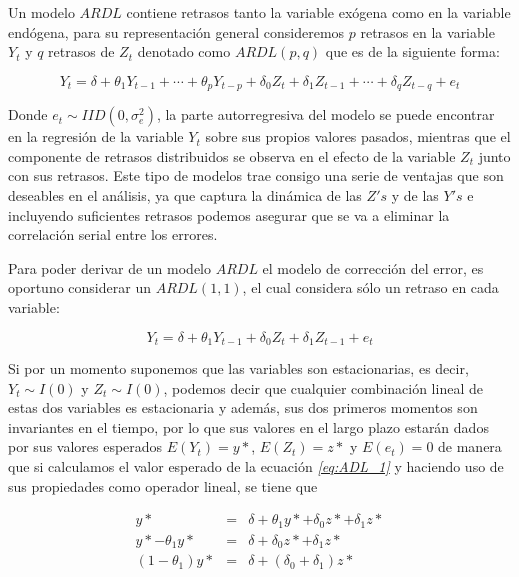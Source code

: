 Un modelo $ARDL$ contiene retrasos tanto la variable exógena como en la variable endógena, para su representación general consideremos $p$ retrasos en la variable $Y_t$ y $q$ retrasos de $Z_t$ denotado como $ARDL(p,q)$ que es de la siguiente forma:

\begin{equation}
Y_t=\delta + \theta_1 Y_{t-1} + \cdots + \theta_p Y_{t-p} + \delta_0 Z_t + \delta_1 Z_{t-1} + \cdots + \delta_q Z_{t-q} + e_t  \label{eq:ADL}
\end{equation}
 
 Donde $e_t\sim IID(0,\sigma^2_e)$, la parte autorregresiva del modelo se puede encontrar en la regresión de la variable $Y_t$ sobre sus propios valores pasados, mientras que el componente de retrasos distribuidos se observa en el efecto de la variable $Z_t$ junto con sus retrasos. Este tipo de modelos trae consigo una serie de ventajas que son deseables en el análisis, ya que captura la dinámica de las $Z's$ y de las $Y's$ e incluyendo suficientes retrasos podemos asegurar que se va a eliminar la correlación serial entre los errores. \bigskip
 
 Para poder derivar de un modelo $ARDL$ el modelo de corrección del error, es oportuno considerar un $ARDL(1,1)$, el cual considera sólo un retraso en cada variable:
 
 \begin{equation}
Y_t=\delta + \theta_1 Y_{t-1} + \delta_0 Z_t + \delta_1 Z_{t-1}  + e_t  \label{eq:ADL_1}
\end{equation}
 
 Si por un momento suponemos que las variables son estacionarias, es decir, $Y_t \sim I(0)$ y $Z_t \sim I(0)$, podemos decir que cualquier combinación lineal de estas dos variables es estacionaria y además, sus dos primeros momentos son invariantes en el tiempo, por lo que sus valores en el largo plazo estarán dados por sus valores esperados $E(Y_t)=y*$, $E(Z_t)=z*$ y $E(e_t)=0$ de manera que si calculamos el valor esperado de la ecuación   \textit{\ref{eq:ADL_1}}  y haciendo uso de sus propiedades como operador lineal, se tiene que
 
 \begin{eqnarray}
y*&=&\delta + \theta_1 y*  + \delta_0 z* + \delta_1 z* \nonumber  \\
 y*- \theta_1 y* &=& \delta + \delta_0 z* + \delta_1 z*  \\
 (1-\theta_1) y* &=& \delta + (\delta_0 + \delta_1)z* \nonumber 
\end{eqnarray}

